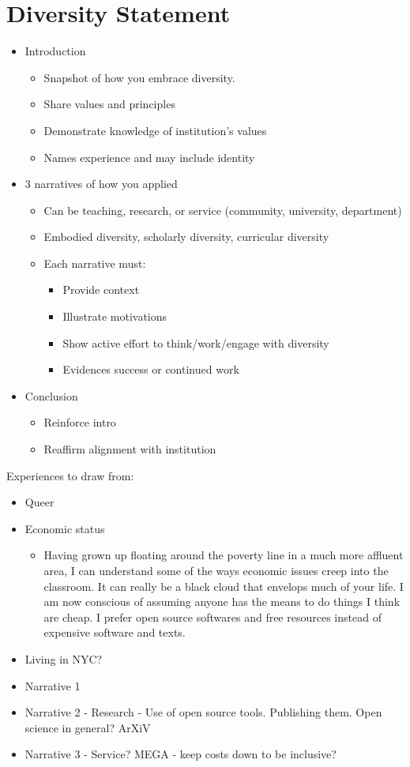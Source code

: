 \pagestyle{plain}
\chapter[Diversity Statement][Diversity Statement]{Diversity Statement}  

\begin{itemize}
\item Introduction
	\begin{itemize}
	\item Snapshot of how you embrace diversity.
	\item Share values and principles
	\item Demonstrate knowledge of institution's values
	\item Names experience and may include identity
	\end{itemize}
\item 3 narratives of how you applied
\begin{itemize}
	\item Can be teaching, research, or service (community, university, department)
	\item Embodied diversity, scholarly diversity, curricular diversity
	\item Each narrative must:
		\begin{itemize}
		\item Provide context
		\item Illustrate motivations
		\item Show active effort to think/work/engage with diversity
		\item Evidences success or continued work
		\end{itemize}
	\end{itemize}
\item Conclusion
\begin{itemize}
	\item Reinforce intro
	\item Reaffirm alignment with institution
	\end{itemize}
\end{itemize}

Experiences to draw from:
\begin{itemize}
\item Queer
\item Economic status
	\begin{itemize}
	\item Having grown up floating around the poverty line in a much more affluent area, I can understand some of the ways economic issues creep into the classroom. It can really be a black cloud that envelops much of your life. I am now conscious of assuming anyone has the means to do things I think are cheap. I prefer open source softwares and free resources instead of expensive software and texts.
	\end{itemize}
\item Living in NYC?
\end{itemize}



\begin{itemize}
\item Narrative 1
\item Narrative 2 - Research - Use of open source tools. Publishing them. Open science in general? ArXiV
\item Narrative 3 - Service? MEGA - keep costs down to be inclusive?
\end{itemize}